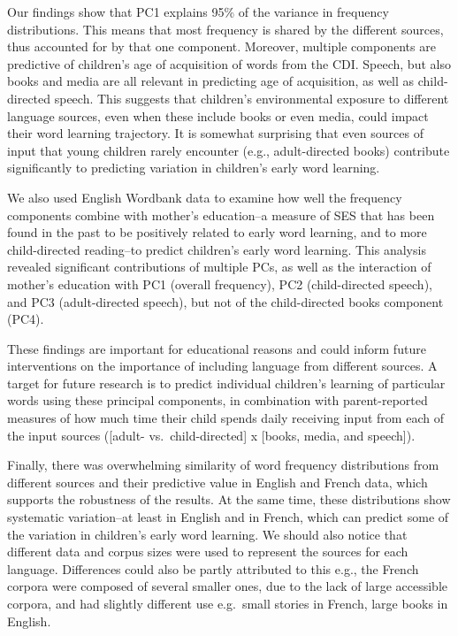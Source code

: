 \documentclass[10pt, letterpaper]{article}
\begin{document}
Our findings show that PC1 explains 95\% of the variance in frequency
distributions. This means that most frequency is shared by the different
sources, thus accounted for by that one component. Moreover, multiple
components are predictive of children's age of acquisition of words from
the CDI. Speech, but also books and media are all relevant in predicting
age of acquisition, as well as child-directed speech. This suggests that
children's environmental exposure to different language sources, even
when these include books or even media, could impact their word learning
trajectory. It is somewhat surprising that even sources of input that
young children rarely encounter (e.g., adult-directed books) contribute
significantly to predicting variation in children's early word learning.

We also used English Wordbank data to examine how well the frequency
components combine with mother's education--a measure of SES that has
been found in the past to be positively related to early word learning,
and to more child-directed reading--to predict children's early word
learning. This analysis revealed significant contributions of multiple
PCs, as well as the interaction of mother's education with PC1 (overall
frequency), PC2 (child-directed speech), and PC3 (adult-directed
speech), but not of the child-directed books component (PC4).

These findings are important for educational reasons and could inform
future interventions on the importance of including language from
different sources. A target for future research is to predict individual
children's learning of particular words using these principal
components, in combination with parent-reported measures of how much
time their child spends daily receiving input from each of the input
sources ({[}adult- vs.~child-directed{]} x {[}books, media, and
speech{]}).

Finally, there was overwhelming similarity of word frequency
distributions from different sources and their predictive value in
English and French data, which supports the robustness of the results.
At the same time, these distributions show systematic variation--at
least in English and in French, which can predict some of the variation
in children's early word learning. We should also notice that different
data and corpus sizes were used to represent the sources for each
language. Differences could also be partly attributed to this e.g., the
French corpora were composed of several smaller ones, due to the lack of
large accessible corpora, and had slightly different use e.g.~small
stories in French, large books in English.
\end{document}
